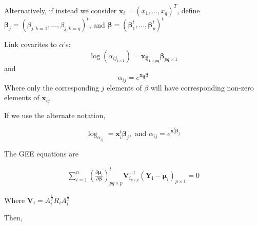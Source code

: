 \documentclass{article}
\begin{document}
Alternatively, if instead we consider $\mathbf{x}_i = (x_1, \ldots , x_q)^T$, define $\boldsymbol\beta_j = (\beta_{j,k = 1}, \ldots, \beta_{j, k = q})^t$, and $\boldsymbol\beta = (\boldsymbol\beta_1^t , \ldots , \boldsymbol\beta_p^t)^t$



Link covarites to $\alpha$'s:
$$\log(\alpha_{ij_{1 \times 1}}) = \mathbf{x_{ij_{1 \times pq}}}\boldsymbol\beta_{pq \times 1}$$
and
$$\alpha_{ij} = e^{\mathbf{x_{ij}}\boldsymbol\beta}$$
Where only the corresponding $j$ elements of $\beta$ will have corresponding non-zero elements of $\mathbf{x}_{ij}$

If we use the alternate notation,

$$\log_{\alpha_{ij}} = \mathbf{x}_i^t \boldsymbol\beta_{j}, \text{ and } \alpha_{ij} = e^{\mathbf{x}_i^t \boldsymbol\beta_j}$$


\newpage

The GEE equations are

\begin{align*}
  \sum_{i = 1}^n  \left(\frac{\partial  \boldsymbol\mu_i }{\partial \boldsymbol\beta }\right)_{pq \times p}^t\mathbf{V}_{i_{p \times p}}^{-1}(\mathbf{Y_i} - \boldsymbol\mu_i)_{p \times 1} = 0
\end{align*}

Where $\boldsymbol V_i = A_i^{\tfrac{1}{2}}R_iA_i^{\tfrac{1}{2}}$



Then,
\end{document}
